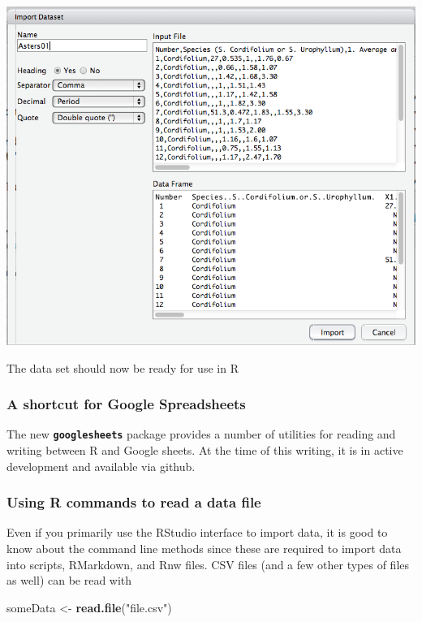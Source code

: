 \documentclass[]{book}
\newenvironment{Shaded}{\begin{snugshade}}{\end{snugshade}}
\newcommand{\KeywordTok}[1]{\textcolor[rgb]{0.13,0.29,0.53}{\textbf{#1}}}
\newcommand{\NormalTok}[1]{#1}
\newcommand{\StringTok}[1]{\textcolor[rgb]{0.31,0.60,0.02}{#1}}
\begin{document}
\includegraphics{images/Import2.png}

The data set should now be ready for use in R

\hypertarget{a-shortcut-for-google-spreadsheets}{%
\subsubsection{A shortcut for Google Spreadsheets}\label{a-shortcut-for-google-spreadsheets}}

The new \textbf{\texttt{googlesheets}} package provides a number of utilities
for reading and writing between R and Google sheets. At the time
of this writing, it is in active development and available via github.

\hypertarget{using-r-commands-to-read-a-data-file}{%
\subsubsection{Using R commands to read a data file}\label{using-r-commands-to-read-a-data-file}}

Even if you primarily use the RStudio interface to import data, it is good to know about the command line methods since these are required to import data into scripts, RMarkdown, and Rnw files. CSV files (and a few other types of files as well) can be read with

\begin{Shaded}
\begin{Highlighting}[]
\NormalTok{someData <-}\StringTok{ }\KeywordTok{read.file}\NormalTok{(}\StringTok{"file.csv"}\NormalTok{)}
\end{Highlighting}
\end{Shaded}
\end{document}

